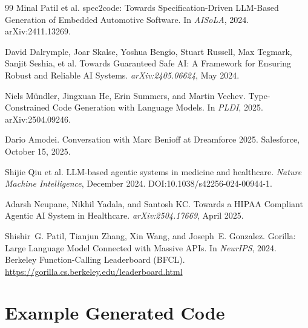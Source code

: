 \documentclass[11pt]{article}
\begin{document}
\begin{thebibliography}{99}
Minal Patil et al.
\newblock spec2code: Towards Specification-Driven LLM-Based Generation of Embedded Automotive Software.
\newblock In \emph{AISoLA}, 2024.
\newblock arXiv:2411.13269.

David Dalrymple, Joar Skalse, Yoshua Bengio, Stuart Russell, Max Tegmark, Sanjit Seshia, et al.
\newblock Towards Guaranteed Safe AI: A Framework for Ensuring Robust and Reliable AI Systems.
\newblock \emph{arXiv:2405.06624}, May 2024.

Niels M\"{u}ndler, Jingxuan He, Erin Summers, and Martin Vechev.
\newblock Type-Constrained Code Generation with Language Models.
\newblock In \emph{PLDI}, 2025.
\newblock arXiv:2504.09246.

Dario Amodei.
\newblock Conversation with Marc Benioff at Dreamforce 2025.
\newblock Salesforce, October 15, 2025.

Shijie Qiu et al.
\newblock LLM-based agentic systems in medicine and healthcare.
\newblock \emph{Nature Machine Intelligence}, December 2024.
\newblock DOI:10.1038/s42256-024-00944-1.

Adarsh Neupane, Nikhil Yadala, and Santosh KC.
\newblock Towards a HIPAA Compliant Agentic AI System in Healthcare.
\newblock \emph{arXiv:2504.17669}, April 2025.

Shishir~G. Patil, Tianjun Zhang, Xin Wang, and Joseph~E. Gonzalez.
\newblock Gorilla: Large Language Model Connected with Massive APIs.
\newblock In \emph{NeurIPS}, 2024.
\newblock Berkeley Function-Calling Leaderboard (BFCL).
\newblock \url{https://gorilla.cs.berkeley.edu/leaderboard.html}

\end{thebibliography}


\appendix

\section{Example Generated Code}
\label{app:example}
\end{document}
